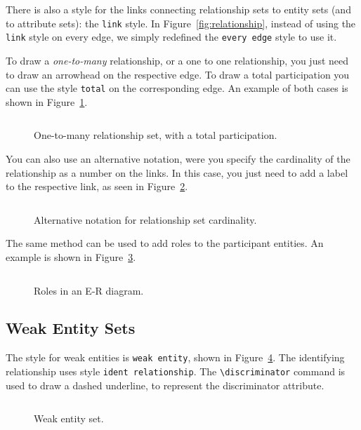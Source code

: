 \documentclass[12pt]{article}
\newcommand{\demo}[1]{
  \bigskip
  \begin{minipage}{\linewidth}
      \begin{center}
          
      \end{center}
      \begin{center}
          \scriptsize
          \inputminted{latex}{snippets/#1.tex}
      \end{center}
  \end{minipage}
}
\begin{document}
There is also a style for the links connecting relationship sets to entity sets
(and to attribute sets): the \texttt{link} style. In
Figure~\ref{fig:relationship}, instead of using the \texttt{link} style on
every edge, we simply redefined the \texttt{every edge} style to use it.

To draw a \emph{one-to-many} relationship, or a one to one relationship, you
just need to draw an arrowhead on the respective edge. To draw a total
participation you can use the style \texttt{total} on the corresponding edge. An
example of both cases is shown in Figure~\ref{fig:relationship1-M}.

\begin{figure}[htb!]
    \centering
    \demo{relationship1-M}
    \caption{One-to-many relationship set, with a total participation.}
\label{fig:relationship1-M}
\end{figure}

You can also use an alternative notation, were you specify the cardinality of
the relationship as a number on the links. In this case, you just need to add a
label to the respective link, as seen in Figure~\ref{fig:relationship-card}.

\begin{figure}[htb!]
    \centering
    \demo{relationship-card}
    \caption{Alternative notation for relationship set cardinality.}
\label{fig:relationship-card}
\end{figure}

The same method can be used to add roles to the participant entities. An
example is shown in Figure~\ref{fig:roles}.

\begin{figure}[htb!]
    \centering
    \demo{roles}
    \caption{Roles in an E-R diagram.}
\label{fig:roles}
\end{figure}

\subsection{Weak Entity Sets}
\label{sec:weak-entities}

The style for weak entities is \texttt{weak entity}, shown in
Figure~\ref{fig:weak}. The identifying relationship uses style
\texttt{ident relationship}. The \verb+\discriminator+ command is used to
draw a dashed underline, to represent the discriminator attribute.

\begin{figure}[htb!]
    \centering
    \demo{weak}
    \caption{Weak entity set.}
\label{fig:weak}
\end{figure}
\end{document}
